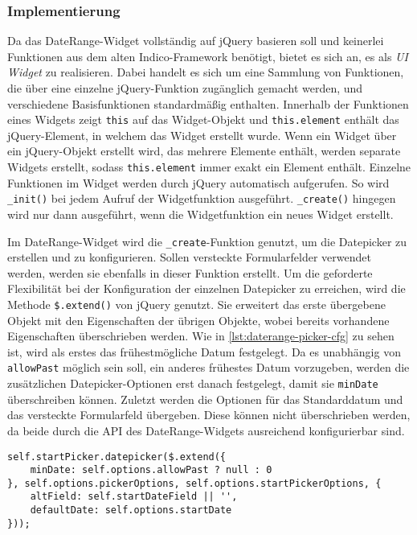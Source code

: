 \subsubsection{Implementierung}

Da das DateRange-Widget vollständig auf jQuery basieren soll und keinerlei Funktionen aus dem alten
Indico-Framework benötigt, bietet es sich an, es als \emph{UI Widget} zu realisieren. Dabei handelt
es sich um eine Sammlung von Funktionen, die über eine einzelne jQuery-Funktion zugänglich gemacht
werden, und verschiedene Basisfunktionen standardmäßig enthalten. Innerhalb der Funktionen eines
Widgets zeigt \lstinline{this} auf das Widget-Objekt und \lstinline{this.element} enthält das
jQuery-Element, in welchem das Widget erstellt wurde. Wenn ein Widget über ein jQuery-Objekt
erstellt wird, das mehrere Elemente enthält, werden separate Widgets erstellt, sodass
\lstinline{this.element} immer exakt ein Element enthält. Einzelne Funktionen im Widget werden durch
jQuery automatisch aufgerufen. So wird \lstinline{_init()} bei jedem Aufruf der Widgetfunktion
ausgeführt. \lstinline{_create()} hingegen wird nur dann ausgeführt, wenn die Widgetfunktion ein
neues Widget erstellt.

Im DateRange-Widget wird die \lstinline{_create}-Funktion genutzt, um die Datepicker zu erstellen
und zu konfigurieren. Sollen versteckte Formularfelder verwendet werden, werden sie ebenfalls
in dieser Funktion erstellt. Um die geforderte Flexibilität bei der Konfiguration der einzelnen
Datepicker zu erreichen, wird die Methode \lstinline{$.extend()} von jQuery genutzt. Sie erweitert
das erste übergebene Objekt mit den Eigenschaften der übrigen Objekte, wobei bereits vorhandene
Eigenschaften überschrieben werden. Wie in \autoref{lst:daterange-picker-cfg} zu sehen ist, wird als
erstes das frühestmögliche Datum festgelegt. Da es unabhängig von \lstinline{allowPast} möglich sein
soll, ein anderes frühestes Datum vorzugeben, werden die zusätzlichen Datepicker-Optionen erst
danach festgelegt, damit sie \lstinline{minDate} überschreiben können. Zuletzt werden die Optionen
für das Standarddatum und das versteckte Formularfeld übergeben. Diese können nicht überschrieben
werden, da beide durch die API des DateRange-Widgets ausreichend konfigurierbar sind.

\begin{lstlisting}[label=lst:daterange-picker-cfg,caption=Datepicker-Konfiguration im DateRange-Widget]
self.startPicker.datepicker($.extend({
    minDate: self.options.allowPast ? null : 0
}, self.options.pickerOptions, self.options.startPickerOptions, {
    altField: self.startDateField || '',
    defaultDate: self.options.startDate
}));
\end{lstlisting}

